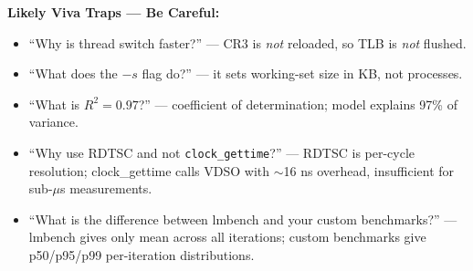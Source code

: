 \documentclass[12pt,a4paper]{article}
\begin{document}
\vspace{1em}
\begin{mdframed}[style=warn]
\textbf{Likely Viva Traps --- Be Careful:}
\begin{itemize}[nosep]
  \item ``Why is thread switch faster?'' --- CR3 is \textit{not} reloaded, so TLB is \textit{not} flushed.
  \item ``What does the $-s$ flag do?'' --- it sets working-set size in KB, not processes.
  \item ``What is $R^2 = 0.97$?'' --- coefficient of determination; model explains 97\% of variance.
  \item ``Why use RDTSC and not \texttt{clock\_gettime}?'' --- RDTSC is per-cycle resolution; clock\_gettime calls VDSO with $\sim$16 ns overhead, insufficient for sub-$\mu$s measurements.
  \item ``What is the difference between lmbench and your custom benchmarks?'' --- lmbench gives only mean across all iterations; custom benchmarks give p50/p95/p99 per-iteration distributions.
\end{itemize}
\end{mdframed}
\end{document}
